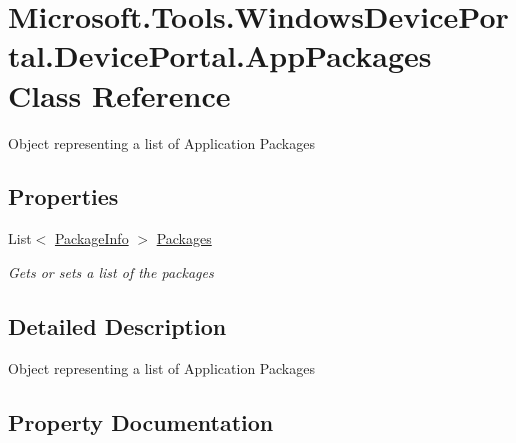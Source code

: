 \hypertarget{class_microsoft_1_1_tools_1_1_windows_device_portal_1_1_device_portal_1_1_app_packages}{}\section{Microsoft.\+Tools.\+Windows\+Device\+Portal.\+Device\+Portal.\+App\+Packages Class Reference}
\label{class_microsoft_1_1_tools_1_1_windows_device_portal_1_1_device_portal_1_1_app_packages}


Object representing a list of Application Packages  


\subsection*{Properties}
\begin{DoxyCompactItemize}
\item 
List$<$ \hyperlink{class_microsoft_1_1_tools_1_1_windows_device_portal_1_1_device_portal_1_1_package_info}{Package\+Info} $>$ \hyperlink{class_microsoft_1_1_tools_1_1_windows_device_portal_1_1_device_portal_1_1_app_packages_ab1e09562bc75ae954e0a3b5a3b78abd3}{Packages}
\begin{DoxyCompactList}\small\item\em Gets or sets a list of the packages \end{DoxyCompactList}\end{DoxyCompactItemize}


\subsection{Detailed Description}
Object representing a list of Application Packages 



\subsection{Property Documentation}
